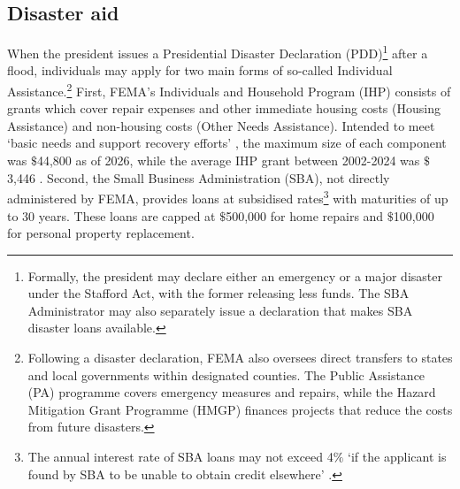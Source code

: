 \documentclass[12pt]{article}
\begin{document}
\subsection{Disaster aid}
When the president issues a Presidential Disaster Declaration (PDD)\footnote{Formally, the president may declare either an emergency or a major disaster under the Stafford Act, with the former releasing less funds. The SBA Administrator may also separately issue a declaration that makes SBA disaster loans available.} after a flood, individuals may apply for two main forms of so-called Individual Assistance.\footnote{Following a disaster declaration, FEMA also oversees direct transfers to states and local governments within designated counties. The Public Assistance (PA) programme covers emergency measures and repairs, while the Hazard Mitigation Grant Programme (HMGP) finances projects that reduce the costs from future disasters.} First, FEMA's Individuals and Household Program (IHP) consists of grants which cover repair expenses and other immediate housing costs (Housing Assistance) and non-housing costs (Other Needs Assistance). Intended to meet `basic needs and support recovery efforts' \citep{crs2024disaster}, the maximum size of each component was $\$$44,800 as of 2026, while the average IHP grant between 2002-2024 was $\$$3,446 \citep{crs2025ihpfaq}. Second, the Small Business Administration (SBA), not directly administered by FEMA, provides loans at subsidised rates\footnote{The annual interest rate of SBA loans may not exceed 4$\%$ `if the applicant is found 
by SBA to be unable to obtain credit elsewhere' \citep[p.~2]{crs2024disaster}.} with maturities of up to 30 years. These loans are capped at $\$$500,000 for home repairs and $\$$100,000 for personal property replacement. 
\end{document}
